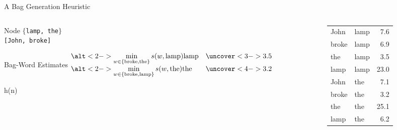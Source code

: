 \documentclass[14pt]{beamer}
\begin{document}
\begin{frame}[label=bag-generation-heuristic]{A Bag Generation Heuristic}
\begin{columns}
\begin{column}{0.6\textwidth}
\begin{block}{Node}
\texttt{$\{$lamp, the$\}$} \\
\texttt{[John, broke]}
\end{block}
\begin{block}{Bag-Word Estimates}
$
\begin{array}{@{} l l @{}}
\alt<2->%
{\min\limits_{w \in \{\mbox{\scriptsize broke}, \mbox{\scriptsize the}\}} s(w, \mbox{lamp})}
{\mbox{lamp}}
& \uncover<3->{3.5} \\
\alt<2->%
{\min\limits_{w \in \{\mbox{\scriptsize broke}, \mbox{\scriptsize lamp}\}} s(w, \mbox{the})}
{\mbox{the}}
& \uncover<4->{3.2} \\
\end{array}
$
\end{block}
\begin{block}{h(n)}
\end{block}
\end{column}
\begin{column}{0.35\textwidth}
\begin{tabular}{ @{} | l l r | @{}}
\hline
John  & lamp & 7.6 \\
broke & lamp & 6.9 \\
the   & lamp & 3.5 \\
lamp  & lamp & 23.0 \\
\hline
\hline
John  & the  & 7.1 \\
broke & the  & 3.2 \\
the   & the  & 25.1 \\
lamp  & the  & 6.2 \\
\hline
\end{tabular}
\end{column}
\end{columns}
\end{frame}
\end{document}
